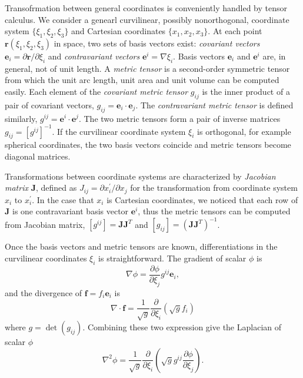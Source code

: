
Transofrmation between general coordinates is conveniently handled by tensor calculus.
We consider a genearl curvilinear, possibly nonorthogonal, coordinate system $\lbrace\xi_1,\xi_2,\xi_3\rbrace$ and Cartesian coordinates $\lbrace x_1,x_2,x_3\rbrace$. At each point $\mathbf{r}(\xi_1,\xi_2,\xi_3)$ in space, two sets of basis vectors exist: \textit{covariant vectors} $\mathbf{e}_i = \partial \mathbf{r} / \partial \xi_i$ and \textit{contravariant vectors} $\mathbf{e}^i = \nabla \xi_i$. 
Basis vectors $\mathbf{e}_i$ and $\mathbf{e}^i$ are, in general, not of unit length.
A \textit{metric tensor} is a second-order symmetric tensor from which the unit arc length, unit area and unit volume can be computed easily. Each element of the \textit{covariant metric tensor} $g_{ij}$ is the inner product of a pair of covariant vectors, $g_{ij} = \mathbf{e}_i \cdot \mathbf{e}_j$. The \textit{contravariant metric tensor} is defined similarly, $g^{ij} = \mathbf{e}^i \cdot \mathbf{e}^j$.
The two metric tensors form a pair of inverse matrices $g_{ij} = [g^{ij}]^{-1}$. If the curvilinear coordinate system $\xi_i$ is orthogonal, for example spherical coordinates, the two basis vectors coincide and metric tensors become diagonal matrices.

Transformations between coordinate systems are characterized by \textit{Jacobian matrix} $\mathbf{J}$, defined as $J_{ij} = \partial x^\prime_i / \partial x_j$ for the transformation from coordinate system $x_i$ to $x^\prime_i$. In the case that $x_i$ is Cartesian coordinates, we noticed that each row of $\mathbf{J}$ is one contravariant basis vector $\mathbf{e}^i$, thus the metric tensors can be computed from Jacobian matrix, $[g^{ij}] = \mathbf{J} \mathbf{J}^T$ and $[g_{ij}] = (\mathbf{J} \mathbf{J}^T)^{-1}$.

Once the basis vectors and metric tensors are known, differentiations in the curvilinear coordinates $\xi_i$ is straightforward. The gradient of scalar $\phi$ is~\cite[]{riley2006mm}
\begin{equation}
\nabla \phi = \frac{\partial \phi}{\partial \xi_j} g^{ij} \mathbf{e}_i ,
\end{equation}
and the divergence of $\mathbf{f} = f_i\mathbf{e}_i$ is
\begin{equation}
\nabla \cdot \mathbf{f} =  \frac{1}{\sqrt{g}} \frac{\partial}{\partial \xi_i}\left(\sqrt{g} f_i\right)
\end{equation}
where $g = \det(g_{ij})$. Combining these two expression give the Laplacian of scalar $\phi$
\begin{equation}
\nabla^2 \phi = \frac{1}{\sqrt{g}} \frac{\partial}{\partial \xi_i}\left(\sqrt{g} g^{ij} \frac{\partial \phi}{\partial \xi_j}\right) .
\end{equation}


